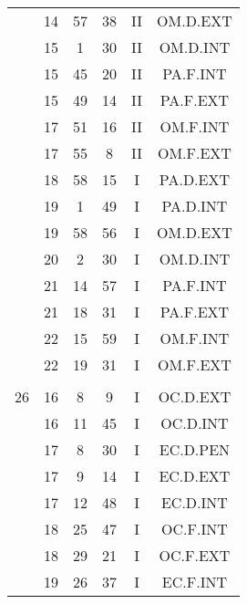 \documentclass[12pt, a4paper]{article}
\begin{document}
\begin{multicols}{3}
{\begin{tabular}{c c c c c c}
	 	 	 	 & 14 & 57 & 38 & II & OM.D.EXT\\%
	 	 	 	 & 15 & 1 & 30 & II & OM.D.INT\\%
	 	 	 	 & 15 & 45 & 20 & II & PA.F.INT\\%
	 	 	 	 & 15 & 49 & 14 & II & PA.F.EXT\\%
	 	 	 	 & 17 & 51 & 16 & II & OM.F.INT\\%
	 	 	 	 & 17 & 55 & 8 & II & OM.F.EXT\\%
	 	 	 	 & 18 & 58 & 15 & I & PA.D.EXT\\%
	 	 	 	 & 19 & 1 & 49 & I & PA.D.INT\\%
	 	 	 	 & 19 & 58 & 56 & I & OM.D.EXT\\%
	 	 	 	 & 20 & 2 & 30 & I & OM.D.INT\\%
	 	 	 	 & 21 & 14 & 57 & I & PA.F.INT\\%
	 	 	 	 & 21 & 18 & 31 & I & PA.F.EXT\\%
	 	 	 	 & 22 & 15 & 59 & I & OM.F.INT\\%
	 	 	 	 & 22 & 19 & 31 & I & OM.F.EXT\\%
	 	 	 	 & & & & & \\%
	 	 	 	26 & 16 & 8 & 9 & I & OC.D.EXT\\%
	 	 	 	 & 16 & 11 & 45 & I & OC.D.INT\\%
	 	 	 	 & 17 & 8 & 30 & I & EC.D.PEN\\%
	 	 	 	 & 17 & 9 & 14 & I & EC.D.EXT\\%
	 	 	 	 & 17 & 12 & 48 & I & EC.D.INT\\%
	 	 	 	 & 18 & 25 & 47 & I & OC.F.INT\\%
	 	 	 	 & 18 & 29 & 21 & I & OC.F.EXT\\%
	 	 	 	 & 19 & 26 & 37 & I & EC.F.INT\\%

\end{tabular}}
\end{multicols}
\end{document}

